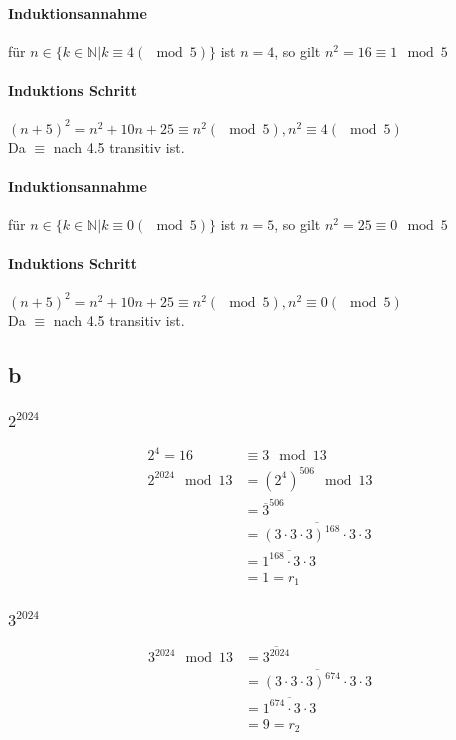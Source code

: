\documentclass{article}
\begin{document}
\paragraph{Induktionsannahme\\}
für $n\in\{k\in \mathbb N|k\equiv 4 (\mod 5)\}$
ist $n = 4$, so gilt $n^2 = 16 \equiv 1 \mod 5$\\
\paragraph{Induktions Schritt\\}
$(n+5)^2=n^2+10n+25\equiv n^2 (\mod 5), n^2 \equiv 4(\mod 5)$\\
Da $\equiv$ nach 4.5 transitiv ist.
\paragraph{Induktionsannahme\\}
für $n\in\{k\in \mathbb N|k\equiv 0 (\mod 5)\}$
ist $n = 5$, so gilt $n^2 = 25 \equiv 0 \mod 5$
\paragraph{Induktions Schritt\\}
$(n+5)^2=n^2+10n+25\equiv n^2 (\mod 5), n^2 \equiv 0(\mod 5)$\\
Da $\equiv$ nach 4.5 transitiv ist.
\subsection*{b}
\subsubsection*{$2^{2024}$}
\begin{align*}
    2^4 = 16 &\equiv 3 \mod 13\\
    2^{2024}\mod 13&=(2^4)^{506}\mod 13\\
    &=\overline{3}^{506}\\
    &=\overline{(3\cdot 3\cdot 3)^{168}\cdot 3\cdot 3}\\
    &=\overline{1^{168}\cdot 3\cdot 3}\\
    &=1=r_1
\end{align*}
\subsubsection*{$3^{2024}$}
\begin{align*}
    3^{2024}\mod 13&=\overline{3^{2024}}\\
    &=\overline{(3\cdot 3\cdot 3)^{674}\cdot 3\cdot 3}\\
    &=\overline{1^{674}\cdot 3\cdot 3}\\
    &=9=r_2
\end{align*}
\end{document}
